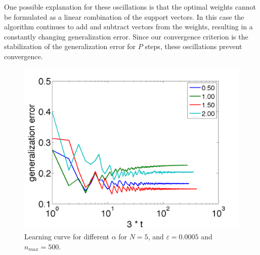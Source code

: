 One possible explanation for these oscillations is that the optimal weights cannot be formulated as a linear combination of the support vectors. In this case the algorithm continues to add and subtract vectors from the weights, resulting in a constantly changing generalization error. Since our convergence criterion is the stabilization of the generalization error for $P$ steps, these oscillations prevent convergence. 


\begin{figure}[H]
	\centering
	\includegraphics[width=0.9\columnwidth]{./img/N5NMAX500error3}
	\caption{Learning curve for different $\alpha$ for $N = 5$, and $\varepsilon = 0.0005$ and $n_{max} = 500$.}
	\label{fig:exp:learningcurve}
\end{figure}